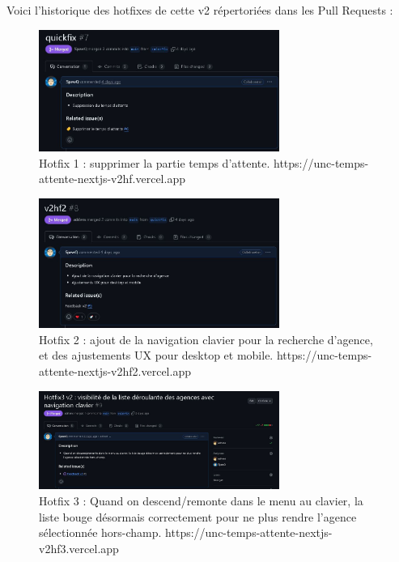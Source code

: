\documentclass[12pt,a4paper]{report}
\begin{document}
\vspace{1cm}
Voici l'historique des hotfixes de cette v2 répertoriées dans les Pull Requests :
\vspace{1cm}

\begin{figure}[h] %
    \centering
    \includegraphics[width=0.7\textwidth]{ressources_rapport/extrait_pr_7.JPG}
    \caption{Hotfix 1 : supprimer la partie temps d'attente. https://unc-temps-attente-nextjs-v2hf.vercel.app}
    \label{fig:exemple}
\end{figure}

\begin{figure}[h] %
    \centering
    \includegraphics[width=0.7\textwidth]{ressources_rapport/extrait_pr_8.JPG}
    \caption{Hotfix 2 : ajout de la navigation clavier pour la recherche d'agence, et des ajustements UX pour desktop et mobile. https://unc-temps-attente-nextjs-v2hf2.vercel.app}
    \label{fig:exemple}
\end{figure}

\begin{figure}[h] %
    \centering
    \includegraphics[width=0.7\textwidth]{ressources_rapport/extrait_pr_9.JPG}
    \caption{Hotfix 3 : Quand on descend/remonte dans le menu au clavier, la liste bouge désormais correctement pour ne plus rendre l'agence sélectionnée hors-champ. https://unc-temps-attente-nextjs-v2hf3.vercel.app}
    \label{fig:exemple}
\end{figure}
\end{document}
